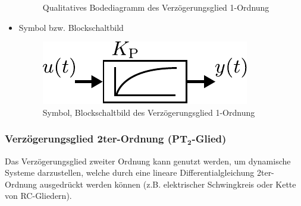 \begin{itemize}
\begin{figure}[h]
		\caption{Qualitatives Bodediagramm des Verzögerungsglied 1-Ordnung}
		\label{fig:pt1gliedbode}
	\end{figure}
	\item Symbol bzw. Blockschaltbild
	\begin{figure}[h]
		\centering
		\includegraphics[width=0.3\linewidth]{Abbildungen/Modellbildung/PDF/PT1gliedBlock.pdf}
		\caption{Symbol, Blockschaltbild des Verzögerungsglied 1-Ordnung}
		\label{fig:pt1glied}
	\end{figure}
\end{itemize}
%
\subsubsection{Verzögerungsglied 2ter-Ordnung (PT$_{\boldsymbol{2}}$-Glied)}
%
Das Verzögerungsglied zweiter Ordnung kann genutzt werden, um dynamische Systeme darzustellen, welche durch eine lineare Differentialgleichung 2ter-Ordnung ausgedrückt werden können (z.B. elektrischer Schwingkreis oder Kette von RC-Gliedern).
%
